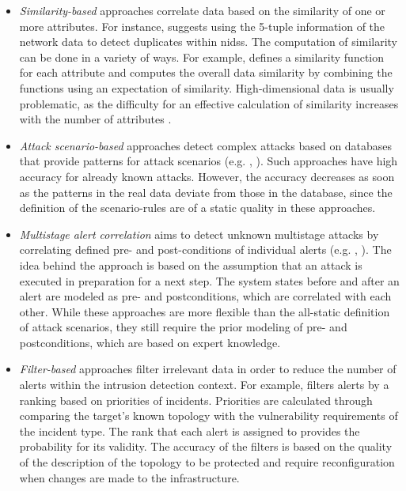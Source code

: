 \begin{itemize}
    \item \textit{Similarity-based} approaches correlate data based on the similarity of one or more attributes. For instance, \cite{goo_2001} suggests using the 5-tuple information of the network data to detect duplicates within \acrshort{nids}s. The computation of similarity can be done in a variety of ways. For example, \cite{goo_2001b} defines a similarity function for each attribute and computes the overall data similarity by combining the functions using an expectation of similarity. High-dimensional data is usually problematic, as the difficulty for an effective calculation of similarity increases with the number of attributes \cite{zho_2009}.
    \item \textit{Attack scenario-based} approaches detect complex attacks based on databases that provide patterns for attack scenarios (e.g. \cite{hut_2004}, \cite{jaj_2002}). Such approaches have high accuracy for already known attacks. However, the accuracy decreases as soon as the patterns in the real data deviate from those in the database, since the definition of the scenario-rules are of a static quality in these approaches.
    \item \textit{Multistage alert correlation} aims to detect unknown multistage attacks by correlating defined pre- and post-conditions of individual alerts (e.g. \cite{cup_2002}, \cite{che_2003}). The idea behind the approach is based on the assumption that an attack is executed in preparation for a next step. The system states before and after an alert are modeled as pre- and postconditions, which are correlated with each other. While these approaches are more flexible than the all-static definition of attack scenarios, they still require the prior modeling of pre- and postconditions, which are based on expert knowledge.
    \item \textit{Filter-based} approaches filter irrelevant data in order to reduce the number of alerts within the intrusion detection context. For example, \cite{goo_2002} filters alerts by a ranking based on priorities of incidents. Priorities are calculated through comparing the target's known topology with the vulnerability requirements of the incident type. The rank that each alert is assigned to provides the probability for its validity. The accuracy of the filters is based on the quality of the description of the topology to be protected and require reconfiguration when changes are made to the infrastructure.
\end{itemize}

